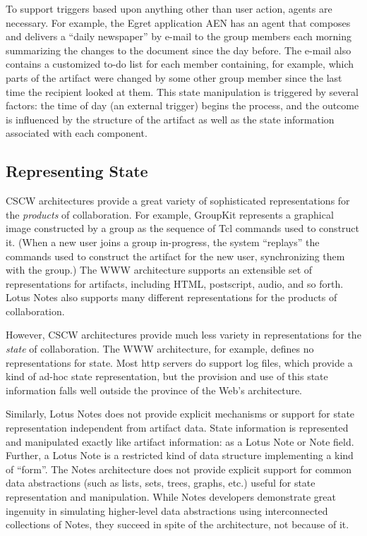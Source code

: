 To support triggers based upon anything other than user action, agents
are necessary.  For example, the Egret application AEN has an agent that
composes and delivers a ``daily newspaper'' by e-mail to the group members
each morning summarizing the changes to the document since the day
before. The e-mail also contains a customized to-do list for each member
containing, for example, which parts of the artifact were changed by some
other group member since the last time the recipient looked at them.  This
state manipulation is triggered by several factors: the time of day (an
external trigger) begins the process, and the outcome is influenced by the
structure of the artifact as well as the state information associated with
each component.  

\subsection{Representing State}

CSCW architectures provide a great variety of sophisticated representations
for the {\em products} of collaboration. For example, GroupKit represents a
graphical image constructed by a group as the sequence of Tcl commands used
to construct it. (When a new user joins a group in-progress, the system
``replays'' the commands used to construct the artifact for the new user,
synchronizing them with the group.) The WWW architecture supports an
extensible set of representations for artifacts, including HTML,
postscript, audio, and so forth. Lotus Notes also supports many different
representations for the products of collaboration.

However, CSCW architectures provide much less variety in representations
for the {\em state} of collaboration.  The WWW architecture, for example,
defines no representations for state.  Most http servers do support log
files, which provide a kind of ad-hoc state representation, but the
provision and use of this state information falls well outside the province
of the Web's architecture.

Similarly, Lotus Notes does not provide explicit mechanisms or support for
state representation independent from artifact data.  State information
is represented and manipulated exactly like artifact information: as a Lotus
Note or Note field.  Further, a Lotus Note is a restricted kind of data structure
implementing a kind of ``form''.  The Notes architecture does not provide
explicit support for common data abstractions (such as lists, sets, trees,
graphs, etc.)  useful for state representation and manipulation.  While
Notes developers demonstrate great ingenuity in simulating
higher-level data abstractions using interconnected collections of Notes,
they succeed in spite of the architecture, not because of it.

